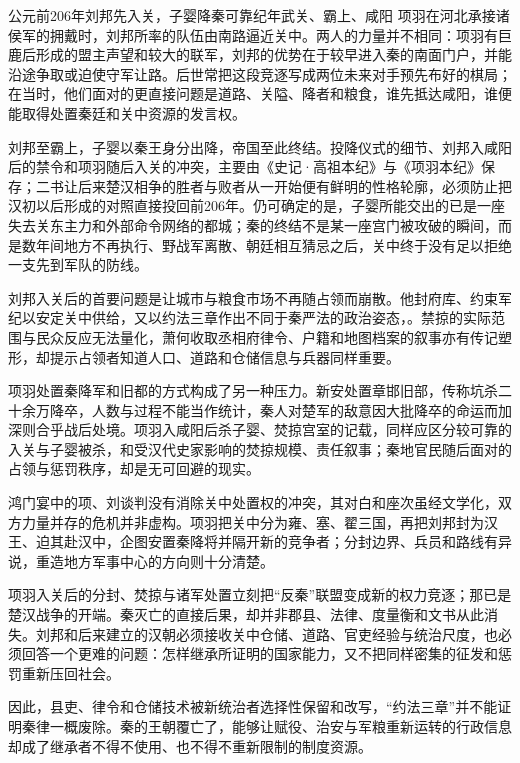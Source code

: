 \begin{event}{公元前206年}{刘邦先入关，子婴降秦}{可靠纪年}{武关、霸上、咸阳}
项羽在河北承接诸侯军的拥戴时，刘邦所率的队伍由南路逼近关中。两人的力量并不相同：项羽有巨鹿后形成的盟主声望和较大的联军，刘邦的优势在于较早进入秦的南面门户，并能沿途争取或迫使守军让路。后世常把这段竞逐写成两位未来对手预先布好的棋局；在当时，他们面对的更直接问题是道路、关隘、降者和粮食，谁先抵达咸阳，谁便能取得处置秦廷和关中资源的发言权。

刘邦至霸上，子婴以秦王身分出降，帝国至此终结。投降仪式的细节、刘邦入咸阳后的禁令和项羽随后入关的冲突，主要由《史记·高祖本纪》与《项羽本纪》保存；二书让后来楚汉相争的胜者与败者从一开始便有鲜明的性格轮廓，必须防止把汉初以后形成的对照直接投回前206年。仍可确定的是，子婴所能交出的已是一座失去关东主力和外部命令网络的都城；秦的终结不是某一座宫门被攻破的瞬间，而是数年间地方不再执行、野战军离散、朝廷相互猜忌之后，关中终于没有足以拒绝一支先到军队的防线。

刘邦入关后的首要问题是让城市与粮食市场不再随占领而崩散。他封府库、约束军纪以安定关中供给，又以约法三章作出不同于秦严法的政治姿态，。禁掠的实际范围与民众反应无法量化，萧何收取丞相府律令、户籍和地图档案的叙事亦有传记塑形，却提示占领者知道人口、道路和仓储信息与兵器同样重要。

项羽处置秦降军和旧都的方式构成了另一种压力。新安处置章邯旧部，传称坑杀二十余万降卒，人数与过程不能当作统计，秦人对楚军的敌意因大批降卒的命运而加深则合乎战后处境。项羽入咸阳后杀子婴、焚掠宫室的记载，同样应区分较可靠的入关与子婴被杀，和受汉代史家影响的焚掠规模、责任叙事；秦地官民随后面对的占领与惩罚秩序，却是无可回避的现实。

鸿门宴中的项、刘谈判没有消除关中处置权的冲突，其对白和座次虽经文学化，双方力量并存的危机并非虚构。项羽把关中分为雍、塞、翟三国，再把刘邦封为汉王、迫其赴汉中，企图安置秦降将并隔开新的竞争者；分封边界、兵员和路线有异说，重造地方军事中心的方向则十分清楚。

项羽入关后的分封、焚掠与诸军处置立刻把“反秦”联盟变成新的权力竞逐；那已是楚汉战争的开端。秦灭亡的直接后果，却并非郡县、法律、度量衡和文书从此消失。刘邦和后来建立的汉朝必须接收关中仓储、道路、官吏经验与统治尺度，也必须回答一个更难的问题：怎样继承所证明的国家能力，又不把同样密集的征发和惩罚重新压回社会。

因此，县吏、律令和仓储技术被新统治者选择性保留和改写，“约法三章”并不能证明秦律一概废除。秦的王朝覆亡了，能够让赋役、治安与军粮重新运转的行政信息却成了继承者不得不使用、也不得不重新限制的制度资源。
\end{event}

